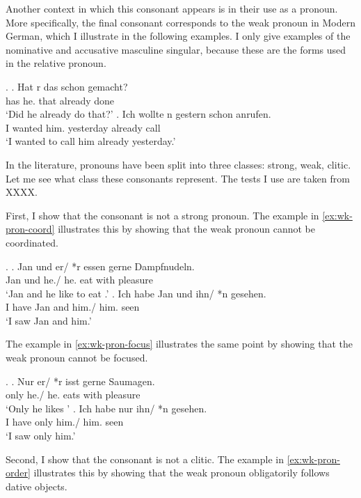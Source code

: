 Another context in which this consonant appears is in their use as a pronoun. More specifically, the final consonant corresponds to the weak pronoun in Modern German, which I illustrate in the following examples. I only give examples of the nominative and accusative masculine singular, because these are the forms used in the relative pronoun.

\ex.
\ag. Hat r das schon gemacht?\\
 has he. that already done\\
 `Did he already do that?'
\bg. Ich wollte n gestern schon anrufen.\\
 I wanted him. yesterday already call\\
 `I wanted to call him already yesterday.'

In the literature, pronouns have been split into three classes: strong, weak, clitic. Let me see what class these consonants represent. The tests I use are taken from  XXXX.

First, I show that the consonant is not a strong pronoun.
The example in \ref{ex:wk-pron-coord} illustrates this by showing that the weak pronoun cannot be coordinated.

\ex.\label{ex:wk-pron-coord}
\ag. Jan und er/ *r essen gerne Dampfnudeln.\\
 Jan und he./ he. eat {with pleasure} \\
 `Jan and he like to eat .'
\bg. Ich habe Jan und ihn/ *n gesehen.\\
 I have Jan and him./ him. seen\\
 `I saw Jan and him.'

The example in \ref{ex:wk-pron-focus} illustrates the same point by showing that the weak pronoun cannot be focused.

\ex.\label{ex:wk-pron-focus}
\ag. Nur er/ *r isst gerne Saumagen.\\
 only he./ he. eats {with pleasure} \\
 `Only he likes '
\bg. Ich habe nur ihn/ *n gesehen.\\
 I have only him./ him. seen\\
 `I saw only him.'

Second, I show that the consonant is not a clitic.
The example in \ref{ex:wk-pron-order} illustrates this by showing that the weak pronoun obligatorily follows dative objects.

